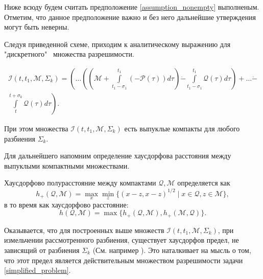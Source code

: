 Ниже всюду будем считать предположение \eqref{assumption_nonempty} выполненым. Отметим,
 что данное предположение важно и без него дальнейшие утверждения могут быть неверны.

Следуя приведенной схеме, приходим к аналитическому выражению для "дискретного" \ множества
 разрешимости.
 
\begin{multline}\label{pontr_analytical}
    \mathcal{I}(t, t_1, \mathcal{M}, \Sigma_k) = \left( \dots \left( \left( \mathcal{M} + 
     \int\limits_{t_1 - \sigma_1}^{t_1} (-\mathcal{P}(\tau)) d\tau \right) \dot{-} \int\limits_
     {t_1 - \sigma_1}^{t_1} \mathcal{Q}(\tau) d\tau \right) + \dots \dot{-} \right. \\
    \left. \int\limits_t^{t + \sigma_k} \mathcal{Q}(\tau) d\tau \right).
\end{multline}

При этом множества \( \mathcal{I} (t, t_1, \mathcal{M}, \Sigma_k) \) есть выпуклые компакты 
 для любого разбиения \( \Sigma_k \).

Для дальнейшего напомним определение хаусдорфова расстояния между выпуклыми компактными 
 множествами.

\begin{definition}
    Хаусдорфово полурасстояние между компактами \( \mathcal{Q}, \mathcal{M} \)
    определяется как 
    \begin{equation*} 
        h_+(\mathcal{Q}, \mathcal{M}) = \max_x \min_z \{(x - z, x - z)^{1/2} \mid x \in \mathcal{Q}, 
        z \in \mathcal{M} \},
    \end{equation*}
    в то время как хаусдорфово расстояние:
    \begin{equation*}
        h(\mathcal{Q}, \mathcal{M}) = \max \{ h_+(\mathcal{Q}, \mathcal{M}), 
         h_+(\mathcal{M}, \mathcal{Q}) \}.
    \end{equation*}
\end{definition}
        
Оказывается, что для построенных выше множеств \( \mathcal{I}(t, t_1, \mathcal{M}, \Sigma_k) \), при измельчении
 рассмотренного разбиения, существует хаусдорфов предел, не зависящий от 
 разбиения \( \Sigma_k \) (См. например \cite{lin_dif_chasing}). Это наталкивает на мысль о том,
 что этот предел является действительным множеством разрешимости задачи \eqref{simplified_problem}.

